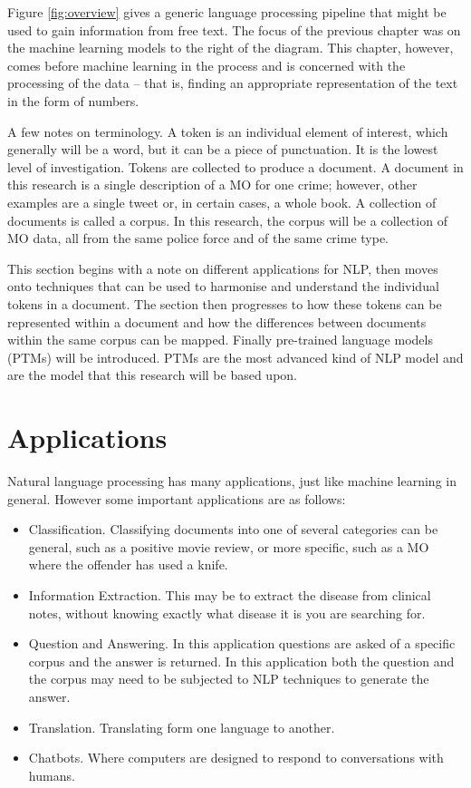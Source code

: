 Figure \ref{fig:overview} gives a generic language processing pipeline that might be used to gain information from free text. The focus of the previous chapter was on the machine learning models to the right of the diagram. This chapter, however, comes before machine learning in the process and is concerned with the processing of the data – that is, finding an appropriate representation of the text in the form of numbers.

A few notes on terminology. A token is an individual element of interest, which generally will be a word, but it can be a piece of punctuation. It is the lowest level of investigation. Tokens are collected to produce a document. A document in this research is a single description of a MO for one crime; however, other examples are a single tweet or, in certain cases, a whole book. A collection of documents is called a corpus. In this research, the corpus will be a collection of MO data, all from the same police force and of the same crime type.

This section begins with a note on different applications for NLP, then moves onto techniques that can be used to harmonise and understand the individual tokens in a document. The section then progresses to how these tokens can be represented within a document and how the differences between documents within the same corpus can be mapped. Finally pre-trained language models (PTMs) will be introduced. PTMs are the most advanced kind of NLP model and are the model that this research will be based upon.

\section{Applications}

Natural language processing has many applications, just like machine learning in general. However some important applications are as follows:

\begin{itemize}

\item{Classification.} Classifying documents into one of several categories can be general, such as a positive movie review, or more specific, such as a MO where the offender has used a knife.

\item{Information Extraction.} This may be to extract the disease from clinical notes, without knowing exactly what disease it is you are searching for.

\item{Question and Answering.} In this application questions are asked of a specific corpus and the answer is returned. In this application both the question and the corpus may need to be subjected to NLP techniques to generate the answer.

\item{Translation.} Translating form one language to another.

\item{Chatbots.} Where computers are designed to respond to conversations with humans.

\end{itemize}

